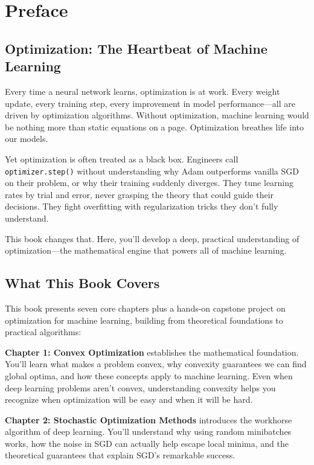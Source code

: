 \documentclass[../main.tex]{subfiles}
\begin{document}
\chapter*{Preface}

\section*{Optimization: The Heartbeat of Machine Learning}

Every time a neural network learns, optimization is at work. Every weight update, every training step, every improvement in model performance---all are driven by optimization algorithms. Without optimization, machine learning would be nothing more than static equations on a page. Optimization breathes life into our models.

Yet optimization is often treated as a black box. Engineers call \texttt{optimizer.step()} without understanding why Adam outperforms vanilla SGD on their problem, or why their training suddenly diverges. They tune learning rates by trial and error, never grasping the theory that could guide their decisions. They fight overfitting with regularization tricks they don't fully understand.

This book changes that. Here, you'll develop a deep, practical understanding of optimization---the mathematical engine that powers all of machine learning.

\section*{What This Book Covers}

This book presents seven core chapters plus a hands-on capstone project on optimization for machine learning, building from theoretical foundations to practical algorithms:

\textbf{Chapter 1: Convex Optimization} establishes the mathematical foundation. You'll learn what makes a problem convex, why convexity guarantees we can find global optima, and how these concepts apply to machine learning. Even when deep learning problems aren't convex, understanding convexity helps you recognize when optimization will be easy and when it will be hard.

\textbf{Chapter 2: Stochastic Optimization Methods} introduces the workhorse algorithm of deep learning. You'll understand why using random minibatches works, how the noise in SGD can actually help escape local minima, and the theoretical guarantees that explain SGD's remarkable success.
\end{document}
